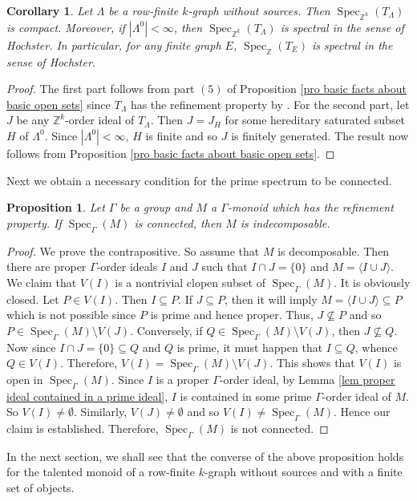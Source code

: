 \documentclass[a4paper,reqno,12pt]{amsart}
\numberwithin{equation}{section}
\newtheorem{cor}[thm]{Corollary}
\newtheorem{prop}[thm]{Proposition}
\theoremstyle{definition}
\theoremstyle{remark}
\newcommand{\Spec}{\operatorname{Spec}}
\begin{document}
\begin{cor}\label{cor spec of TM is compact}
Let $\Lambda$ be a row-finite $k$-graph without sources. Then $\Spec_{\mathbb{Z}^k}(T_\Lambda)$ is compact. Moreover, if $|\Lambda^0|<\infty$, then $\Spec_{\mathbb{Z}^k}(T_\Lambda)$ is spectral in the sense of Hochster. In particular, for any finite graph $E$, $\Spec_{\mathbb{Z}}(T_E)$ is spectral in the sense of Hochster. 
\end{cor}
\begin{proof}
The first part follows from part $(5)$ of Proposition \ref{pro basic facts about basic open sets} since $T_\Lambda$ has the refinement property by \cite[Theorem 3.18]{HMPS1}. For the second part, let $J$ be any $\mathbb{Z}^k$-order ideal of $T_\Lambda$. Then $J=J_H$ for some hereditary saturated subset $H$ of $\Lambda^0$. Since $|\Lambda^0|<\infty$, $H$ is finite and so $J$ is finitely generated. The result now follows from Proposition \ref{pro basic facts about basic open sets}.
\end{proof}

Next we obtain a necessary condition for the prime spectrum to be connected. 

\begin{prop}\label{pro Necessary condition for connectedness}
Let $\Gamma$ be a group and $M$ a $\Gamma$-monoid which has the refinement property. If $\Spec_\Gamma(M)$ is connected, then $M$ is indecomposable. 
\end{prop}
\begin{proof}
We prove the contrapositive. So assume that $M$ is decomposable. Then there are proper $\Gamma$-order ideals $I$ and $J$ such that $I\cap J=\{0\}$ and $M=\langle I\cup J\rangle$. We claim that $V(I)$ is a nontrivial clopen subset of $\Spec_\Gamma(M)$. It is obviously closed. Let $P\in V(I)$. Then $I\subseteq P$. If $J\subseteq P$, then it will imply $M=\langle I\cup J\rangle\subseteq P$ which is not possible since $P$ is prime and hence proper. Thus, $J\nsubseteq P$ and so $P\in \Spec_\Gamma(M)\setminus V(J)$. Conversely, if $Q\in \Spec_\Gamma(M)\setminus V(J)$, then $J\nsubseteq Q$. Now since $I\cap J=\{0\}\subseteq Q$ and $Q$ is prime, it must happen that $I\subseteq Q$, whence $Q\in V(I)$. Therefore, $V(I)=\Spec_\Gamma(M)\setminus V(J)$. This shows that $V(I)$ is open in $\Spec_\Gamma(M)$. Since $I$ is a proper $\Gamma$-order ideal, by Lemma \ref{lem proper ideal contained in a prime ideal}, $I$ is contained in some prime $\Gamma$-order ideal of $M$. So $V(I)\neq \emptyset$. Similarly, $V(J)\neq \emptyset$ and so $V(I)\neq \Spec_\Gamma(M)$. Hence our claim is established. Therefore, $\Spec_\Gamma(M)$ is not connected. 
\end{proof}
In the next section, we shall see that the converse of the above proposition holds for the talented monoid of a row-finite $k$-graph without sources and with a finite set of objects.  
\end{document}
